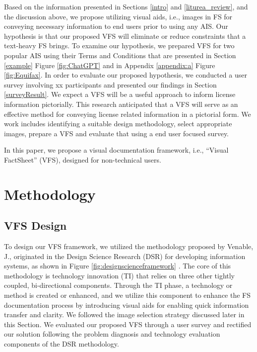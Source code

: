 \documentclass[manuscript,review,anonymous]{acmart}
\begin{document}
	Based on the information presented in Sections \ref{intro} and \ref{liturea_review}, and the discussion above, we propose utilizing visual aids, i.e., images in FS for conveying necessary information to end users prior to using any AIS. Our hypothesis is that our proposed VFS will eliminate or reduce constraints that a text-heavy FS brings. To examine our hypothesis, we prepared VFS for two popular AIS using their Terms and Conditions that are presented in Section \ref{example} Figure \ref{fig:ChatGPT} and in Appendix \ref{appendix:a} Figure \ref{fig:Equifax}. In order to evaluate our proposed hypothesis, we conducted a user survey involving xx participants and presented our findings in Section \ref{surveyResult}. We expect a VFS will be a useful approach to inform license information pictorially. This research anticipated that a VFS will serve as an effective method for conveying license related information in a pictorial form. We work includes identifying a suitable design methodology, select appropriate images, prepare a VFS and evaluate that using a end user focused survey.

	In this paper, we propose a visual documentation framework, i.e., \enquote{Visual FactSheet} (VFS), designed for non-technical users.

\section{Methodology}\label{VFS_Methodology}

\subsection{VFS Design}

	To design our VFS framework, we utilized the methodology proposed by Venable, J., originated in the Design Science Research (DSR) for developing information systems, as shown in Figure \ref{fig:designscienceframework} \cite{Venable2006TheRO}. The core of this methodology is technology innovation (TI) that relies on three other tightly coupled, bi-directional components. Through the TI phase, a technology or method is created or enhanced, and we utilize this component to enhance the FS documentation process by introducing visual aids for enabling quick information transfer and clarity. We followed the image selection strategy discussed later in this Section. We evaluated our proposed VFS through a user survey and rectified our solution following the problem diagnosis and technology evaluation components of the DSR methodology.
\end{document}
